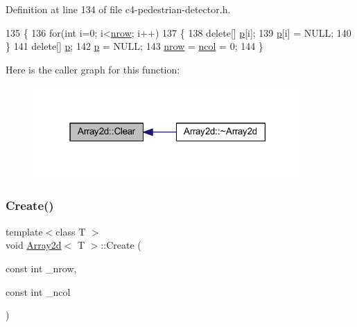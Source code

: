 Definition at line 134 of file c4-\/pedestrian-\/detector.\+h.


\begin{DoxyCode}
135 \{
136     \textcolor{keywordflow}{for}(\textcolor{keywordtype}{int} i=0; i<\mbox{\hyperlink{class_array2d_a373dd63664bee40ef720d183d03e5bdb}{nrow}}; i++)
137     \{
138         \textcolor{keyword}{delete}[] \mbox{\hyperlink{class_array2d_ac7b70bc423364c43c7c174cdde515380}{p}}[i];
139         \mbox{\hyperlink{class_array2d_ac7b70bc423364c43c7c174cdde515380}{p}}[i] = NULL;
140     \}
141     \textcolor{keyword}{delete}[] \mbox{\hyperlink{class_array2d_ac7b70bc423364c43c7c174cdde515380}{p}};
142     \mbox{\hyperlink{class_array2d_ac7b70bc423364c43c7c174cdde515380}{p}} = NULL;
143     \mbox{\hyperlink{class_array2d_a373dd63664bee40ef720d183d03e5bdb}{nrow}} = \mbox{\hyperlink{class_array2d_afe48cd05774cae5b6872324ae49e089b}{ncol}} = 0;
144 \}
\end{DoxyCode}
Here is the caller graph for this function\+:\nopagebreak
\begin{figure}[H]
\begin{center}
\leavevmode
\includegraphics[width=291pt]{class_array2d_a9902a80867777fbf3ba64a6d8c10606e_icgraph}
\end{center}
\end{figure}
\mbox{\label{class_array2d_af1d2cec0973cedfe74ae5b967532922f}} 
\subsubsection{\texorpdfstring{Create()}{Create()}}
{\footnotesize\ttfamily template$<$class T $>$ \\
void \mbox{\hyperlink{class_array2d}{Array2d}}$<$ T $>$\+::Create (\begin{DoxyParamCaption}\item[{const int}]{\+\_\+nrow,  }\item[{const int}]{\+\_\+ncol }\end{DoxyParamCaption})}




